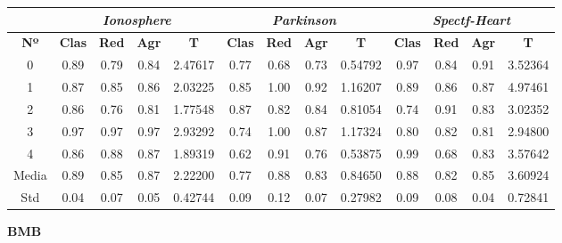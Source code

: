 \documentclass[10pt, a4paper]{article}
\theoremstyle{theorem-style}
\theoremstyle{theorem-style}
\theoremstyle{theorem2-style}
\theoremstyle{definition-style}
\theoremstyle{remark-style}
\theoremstyle{example-style}
\theoremstyle{definition-style}
\theoremstyle{remark-style}
\theoremstyle{remark-style}
\begin{document}
\begin{table}[ht!]
\begin{tabular}{ccccc|cccc|cccc}
\centering
 & \multicolumn{4}{c}{\textit{Ionosphere}} & \multicolumn{4}{c}{\textit{Parkinson}} & \multicolumn{4}{c}{\textit{Spectf-Heart}} \\ \hline
\textbf{Nº} & \textbf{Clas} & \textbf{Red} & \textbf{Agr} & \textbf{T} & \textbf{Clas} & \textbf{Red} & \textbf{Agr} & \textbf{T} & \textbf{Clas} & \textbf{Red} & \textbf{Agr} & \textbf{T} \\ \hline

0&	 0.89 & 0.79 & 0.84 & 2.47617 & 	0.77 & 0.68 & 0.73 & 0.54792 & 		0.97 & 0.84 & 0.91 & 3.52364 \\ 
1&	 0.87 & 0.85 & 0.86 & 2.03225 & 	0.85 & 1.00 & 0.92 & 1.16207 & 		0.89 & 0.86 & 0.87 & 4.97461 \\ 
2&	 0.86 & 0.76 & 0.81 & 1.77548 & 	0.87 & 0.82 & 0.84 & 0.81054 & 		0.74 & 0.91 & 0.83 & 3.02352 \\ 
3&	 0.97 & 0.97 & 0.97 & 2.93292 & 	0.74 & 1.00 & 0.87 & 1.17324 & 		0.80 & 0.82 & 0.81 & 2.94800 \\ 
4&	 0.86 & 0.88 & 0.87 & 1.89319 & 	0.62 & 0.91 & 0.76 & 0.53875 & 		0.99 & 0.68 & 0.83 & 3.57642 \\
\hline 
Media&	 0.89 & 0.85 & 0.87 & 2.22200	&0.77 & 0.88 & 0.83 & 0.84650	&	0.88 & 0.82 & 0.85 & 3.60924
 \\ Std&	 0.04 & 0.07 & 0.05 & 0.42744	&0.09 & 0.12 & 0.07 & 0.27982	&	0.09 & 0.08 & 0.04 & 0.72841
 \\  

\end{tabular}
\end{table}
\pagebreak
\textbf{BMB}
\end{document}
